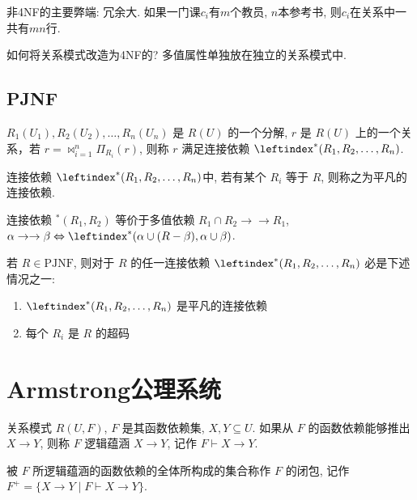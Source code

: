 非4NF的主要弊端: 冗余大. 如果一门课$c_i$有$m$个教员, $n$本参考书, 则$c_i$在关系中一共有$mn$行.

如何将关系模式改造为4NF的? 多值属性单独放在独立的关系模式中.

\subsection{PJNF}

\begin{definition}[连接依赖]
  $R_1(U_1), R_2(U_2), \dots, R_n(U_n)$ 是 $R(U)$ 的一个分解,
  $r$ 是 $R(U)$ 上的一个关系，若 $r = \bowtie_{i=1}^{n} \Pi_{R_i}(r)$,
  则称 $r$ 满足连接依赖 $\leftindex^*(R_1, R_2, \dots, R_n)$.
\end{definition}


连接依赖 $\leftindex^{*}(R_1, R_2, \ldots, R_n)$中, 若有某个 $R_i$ 等于 $R$, 则称之为平凡的连接依赖.

连接依赖 $^{*}(R_1, R_2)$ 等价于多值依赖 $R_1 \cap R_2 \to\to R_1$,
$\alpha \to\to \beta \Leftrightarrow \leftindex^{*}(\alpha \cup (R - \beta), \alpha \cup \beta)$.

\begin{definition}[PJNF]
  若 $R \in \text{PJNF}$, 则对于 $R$ 的任一连接依赖 $\leftindex^{*}(R_1, R_2, \dots, R_n)$ 必是下述情况之一:
  \begin{enumerate}
      \item $\leftindex^{*}(R_1, R_2, \dots, R_n)$ 是平凡的连接依赖
      \item 每个 $R_i$ 是 $R$ 的超码
  \end{enumerate}
\end{definition}

\section{Armstrong公理系统}

\begin{definition}[逻辑蕴含]
  关系模式 $R(U, F)$, $F$ 是其函数依赖集, $X, Y \subseteq U$.
  如果从 $F$ 的函数依赖能够推出 $X \rightarrow Y$,
  则称 $F$ 逻辑蕴涵 $X \rightarrow Y$, 记作 $F \vdash X \rightarrow Y$.
\end{definition}

\begin{definition}[闭包]
  被 $F$ 所逻辑蕴涵的函数依赖的全体所构成的集合称作 $F$ 的闭包, 
  记作 $F^+ = \{X \rightarrow Y \mid F \vdash X \rightarrow Y\}$.
\end{definition}

